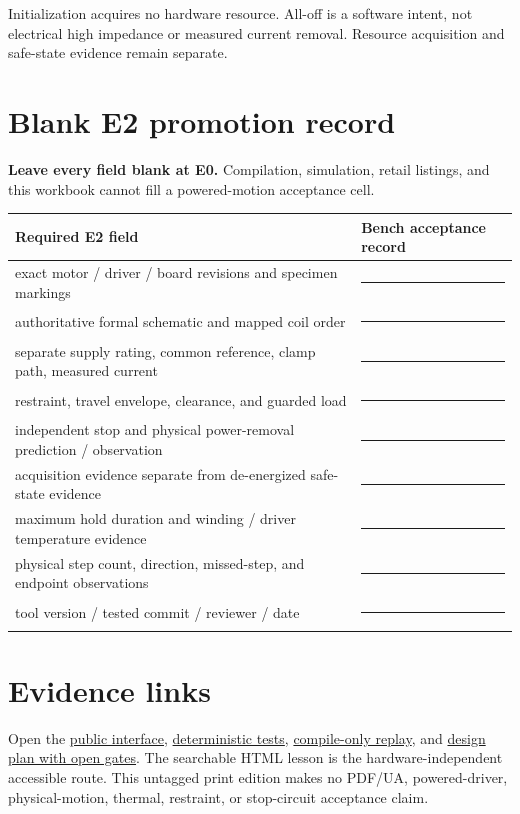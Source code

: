 \documentclass[11pt]{article}
\newcommand{\shortblank}{\rule{0.62in}{0.4pt}}
\begin{document}
Initialization acquires no hardware resource. All-off is a software intent,
not electrical high impedance or measured current removal. Resource
acquisition and safe-state evidence remain separate.

\section{Blank E2 promotion record}
\textbf{Leave every field blank at E0.} Compilation, simulation, retail
listings, and this workbook cannot fill a powered-motion acceptance cell.
\par\smallskip
\begin{tabularx}{\linewidth}{@{}>{\raggedright\arraybackslash}X X@{}}
\toprule
Required E2 field & Bench acceptance record\\
\midrule
exact motor / driver / board revisions and specimen markings & \shortblank\\[5pt]
authoritative formal schematic and mapped coil order & \shortblank\\[5pt]
separate supply rating, common reference, clamp path, measured current & \shortblank\\[5pt]
restraint, travel envelope, clearance, and guarded load & \shortblank\\[5pt]
independent stop and physical power-removal prediction / observation & \shortblank\\[5pt]
acquisition evidence separate from de-energized safe-state evidence & \shortblank\\[5pt]
maximum hold duration and winding / driver temperature evidence & \shortblank\\[5pt]
physical step count, direction, missed-step, and endpoint observations & \shortblank\\[5pt]
tool version / tested commit / reviewer / date & \shortblank\\
\bottomrule
\end{tabularx}

\section{Evidence links}
Open the
\href{https://github.com/spincyc/adk/blob/main/src/bounded_stepper_sequence.h}
{public interface},
\href{https://github.com/spincyc/adk/blob/main/tests/test_bounded_stepper_sequence.cpp}
{deterministic tests},
\href{https://github.com/spincyc/adk/blob/main/examples/Lesson047BoundedStepperSequence/Lesson047BoundedStepperSequence.ino}
{compile-only replay}, and
\href{https://github.com/spincyc/adk/blob/main/docs/design/LESSONS_046_048_KINETIC_SCULPTURE_PLAN.md}
{design plan with open gates}.
The searchable HTML lesson is the hardware-independent accessible route.
This untagged print edition makes no PDF/UA, powered-driver, physical-motion,
thermal, restraint, or stop-circuit acceptance claim.
\end{document}
